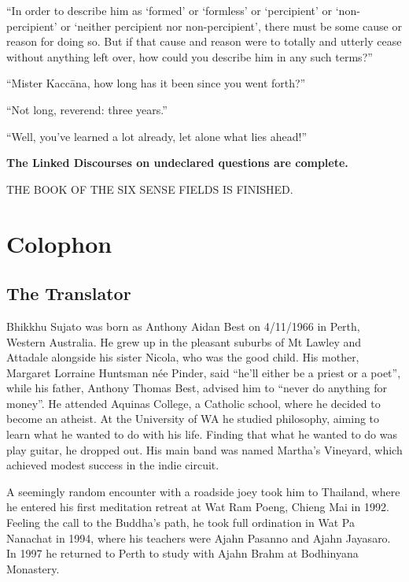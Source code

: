 \documentclass[12pt,openany]{book}%
\newcommand*{\scendbook}[1]{\bigskip\begin{Center}\uppercase{#1}\end{Center}\addvspace{1em}}
\newcommand*{\scendkanda}[1]{\begin{Center}\textbf{#1}\end{Center}\addvspace{1em}} %
\let\oldbackmatter\backmatter
\renewcommand{\backmatter}{%
\chapterfont{\setstretch{.85}\normalfont\centering}%
\sectionfont{\setstretch{.85}\normalfont\BalancedRagged}%
\pagestyle{plainer}%
\oldbackmatter}
\begin{document}
“In order to describe him as ‘formed’ or ‘formless’ or ‘percipient’ or ‘non-percipient’ or ‘neither percipient nor non-percipient’, there must be some cause or reason for doing so. But if that cause and reason were to totally and utterly cease without anything left over, how could you describe him in any such terms?” 

“Mister \textsanskrit{Kaccāna}, how long has it been since you went forth?” 

“Not long, reverend: three years.” 

“Well, you’ve learned a lot already, let alone what lies ahead!” 

\scendkanda{The Linked Discourses on undeclared questions are complete. }

\scendbook{The Book of the Six Sense Fields is finished. }

%
\backmatter%
\chapter*{Colophon}

\section*{The Translator}

Bhikkhu Sujato was born as Anthony Aidan Best on 4/11/1966 in Perth, Western Australia. He grew up in the pleasant suburbs of Mt Lawley and Attadale alongside his sister Nicola, who was the good child. His mother, Margaret Lorraine Huntsman née Pinder, said “he’ll either be a priest or a poet”, while his father, Anthony Thomas Best, advised him to “never do anything for money”. He attended Aquinas College, a Catholic school, where he decided to become an atheist. At the University of WA he studied philosophy, aiming to learn what he wanted to do with his life. Finding that what he wanted to do was play guitar, he dropped out. His main band was named Martha’s Vineyard, which achieved modest success in the indie circuit. 

A seemingly random encounter with a roadside joey took him to Thailand, where he entered his first meditation retreat at Wat Ram Poeng, Chieng Mai in 1992. Feeling the call to the Buddha’s path, he took full ordination in Wat Pa Nanachat in 1994, where his teachers were Ajahn Pasanno and Ajahn Jayasaro. In 1997 he returned to Perth to study with Ajahn Brahm at Bodhinyana Monastery. 
\end{document}
